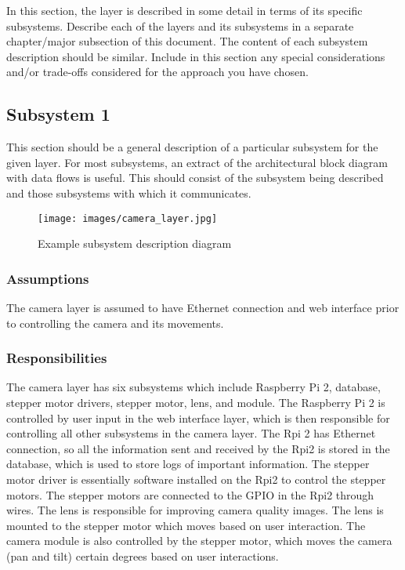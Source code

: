 In this section, the layer is described in some detail in terms of its specific subsystems. Describe each of the layers and its subsystems in a separate chapter/major subsection of this document. The content of each subsystem description should be similar. Include in this section any special considerations and/or trade-offs considered for the approach you have chosen.

\subsection{Subsystem 1}
This section should be a general description of a particular subsystem for the given layer. For most subsystems, an extract of the architectural block diagram with data flows is useful. This should consist of the subsystem being described and those subsystems with which it communicates.

\begin{figure}[h!]
	\centering
 	\texttt{[image: images/camera\_layer.jpg]}
 \caption{Example subsystem description diagram}
\end{figure}

\subsubsection{Assumptions}
The camera layer is assumed to have Ethernet connection and web interface prior to controlling the camera and its movements.  

\subsubsection{Responsibilities}
The camera layer has six subsystems which include Raspberry Pi 2, database, stepper motor drivers, stepper motor, lens, and module. The Raspberry Pi 2 is controlled by user input in the web interface layer, which is then responsible for controlling all other subsystems in the camera layer. The Rpi 2 has Ethernet connection, so all the information sent and received by the Rpi2 is stored in the database, which is used to store logs of important information. The stepper motor driver is essentially software installed on the Rpi2 to control the stepper motors. The stepper motors are connected to the GPIO in the Rpi2 through wires. The lens is responsible for improving camera quality images. The lens is mounted to the stepper motor which moves based on user interaction. The camera module is also controlled by the stepper motor, which moves the camera (pan and tilt) certain degrees based on user interactions.

